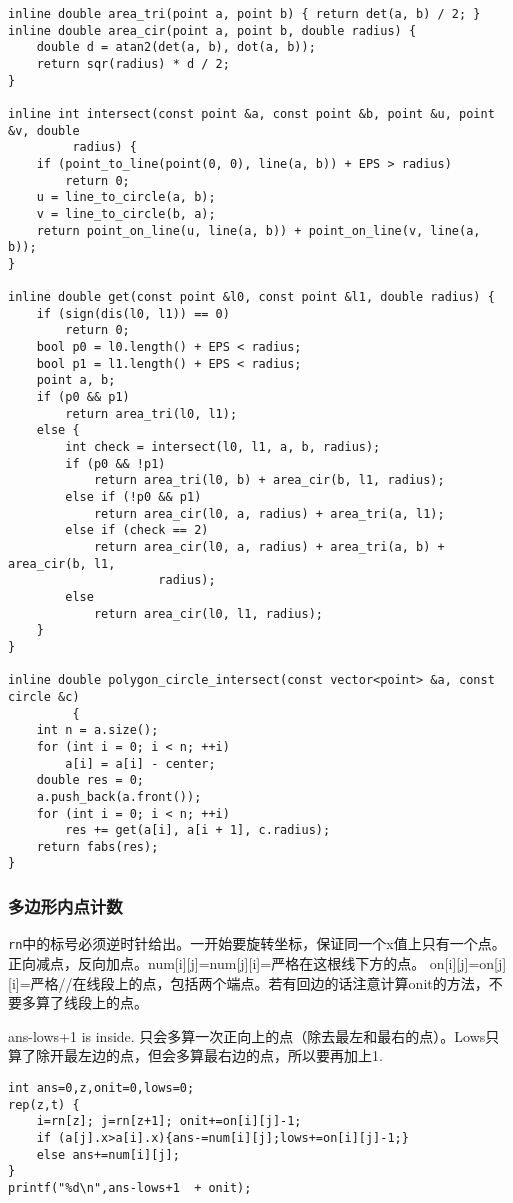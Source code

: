 \documentclass{article}
\begin{document}
\begin{lstlisting}
inline double area_tri(point a, point b) { return det(a, b) / 2; }
inline double area_cir(point a, point b, double radius) {
    double d = atan2(det(a, b), dot(a, b));
    return sqr(radius) * d / 2;
}

inline int intersect(const point &a, const point &b, point &u, point &v, double
         radius) {
    if (point_to_line(point(0, 0), line(a, b)) + EPS > radius)
        return 0;
    u = line_to_circle(a, b);
    v = line_to_circle(b, a);
    return point_on_line(u, line(a, b)) + point_on_line(v, line(a, b));
}

inline double get(const point &l0, const point &l1, double radius) {
    if (sign(dis(l0, l1)) == 0)
        return 0;
    bool p0 = l0.length() + EPS < radius;
    bool p1 = l1.length() + EPS < radius;
    point a, b;
    if (p0 && p1)
        return area_tri(l0, l1);
    else {
        int check = intersect(l0, l1, a, b, radius);
        if (p0 && !p1)
            return area_tri(l0, b) + area_cir(b, l1, radius);
        else if (!p0 && p1)
            return area_cir(l0, a, radius) + area_tri(a, l1);
        else if (check == 2)
            return area_cir(l0, a, radius) + area_tri(a, b) + area_cir(b, l1,
                     radius);
        else
            return area_cir(l0, l1, radius);
    }
}

inline double polygon_circle_intersect(const vector<point> &a, const circle &c)
         {
    int n = a.size();
    for (int i = 0; i < n; ++i)
        a[i] = a[i] - center;
    double res = 0;
    a.push_back(a.front());
    for (int i = 0; i < n; ++i)
        res += get(a[i], a[i + 1], c.radius);
    return fabs(res);
}
\end{lstlisting}

\subsubsection{多边形内点计数}

\texttt{rn}中的标号必须逆时针给出。一开始要旋转坐标，保证同一个x值上只有一个点。正向减点，反向加点。num{[}i{]}{[}j{]}=num{[}j{]}{[}i{]}=严格在这根线下方的点。
on{[}i{]}{[}j{]}=on{[}j{]}{[}i{]}=严格//在线段上的点，包括两个端点。若有回边的话注意计算onit的方法，不要多算了线段上的点。

ans-lows+1 is inside.
只会多算一次正向上的点（除去最左和最右的点）。Lows只算了除开最左边的点，但会多算最右边的点，所以要再加上1.

\begin{lstlisting}
int ans=0,z,onit=0,lows=0;
rep(z,t) {
    i=rn[z]; j=rn[z+1]; onit+=on[i][j]-1;
    if (a[j].x>a[i].x){ans-=num[i][j];lows+=on[i][j]-1;}
    else ans+=num[i][j];
}
printf("%d\n",ans-lows+1  + onit);
\end{lstlisting}
\end{document}
